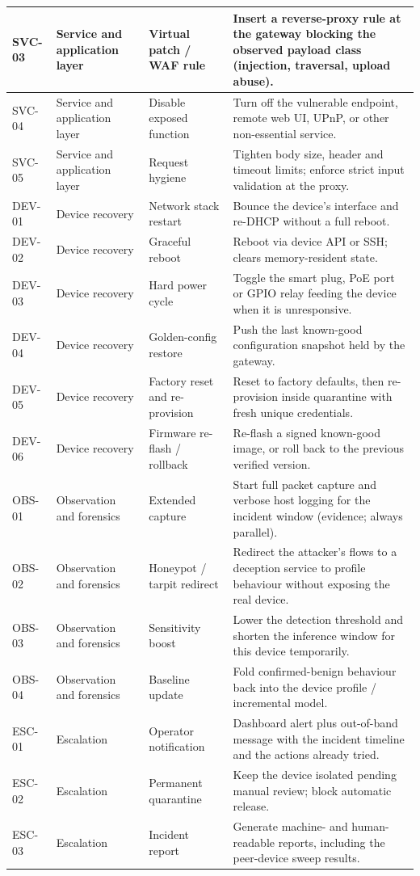 \begin{longtable}{|p{}|p{}|p{}|p{}|}
\hline
SVC-03 & Service and application layer & Virtual patch / WAF rule & Insert a reverse-proxy rule at the gateway blocking the observed payload class (injection, traversal, upload abuse). \\
\hline
SVC-04 & Service and application layer & Disable exposed function & Turn off the vulnerable endpoint, remote web UI, UPnP, or other non-essential service. \\
\hline
SVC-05 & Service and application layer & Request hygiene & Tighten body size, header and timeout limits; enforce strict input validation at the proxy. \\
\hline
DEV-01 & Device recovery & Network stack restart & Bounce the device's interface and re-DHCP without a full reboot. \\
\hline
DEV-02 & Device recovery & Graceful reboot & Reboot via device API or SSH; clears memory-resident state. \\
\hline
DEV-03 & Device recovery & Hard power cycle & Toggle the smart plug, PoE port or GPIO relay feeding the device when it is unresponsive. \\
\hline
DEV-04 & Device recovery & Golden-config restore & Push the last known-good configuration snapshot held by the gateway. \\
\hline
DEV-05 & Device recovery & Factory reset and re-provision & Reset to factory defaults, then re-provision inside quarantine with fresh unique credentials. \\
\hline
DEV-06 & Device recovery & Firmware re-flash / rollback & Re-flash a signed known-good image, or roll back to the previous verified version. \\
\hline
OBS-01 & Observation and forensics & Extended capture & Start full packet capture and verbose host logging for the incident window (evidence; always parallel). \\
\hline
OBS-02 & Observation and forensics & Honeypot / tarpit redirect & Redirect the attacker's flows to a deception service to profile behaviour without exposing the real device. \\
\hline
OBS-03 & Observation and forensics & Sensitivity boost & Lower the detection threshold and shorten the inference window for this device temporarily. \\
\hline
OBS-04 & Observation and forensics & Baseline update & Fold confirmed-benign behaviour back into the device profile / incremental model. \\
\hline
ESC-01 & Escalation & Operator notification & Dashboard alert plus out-of-band message with the incident timeline and the actions already tried. \\
\hline
ESC-02 & Escalation & Permanent quarantine & Keep the device isolated pending manual review; block automatic release. \\
\hline
ESC-03 & Escalation & Incident report & Generate machine- and human-readable reports, including the peer-device sweep results. \\
\hline
\end{longtable}

